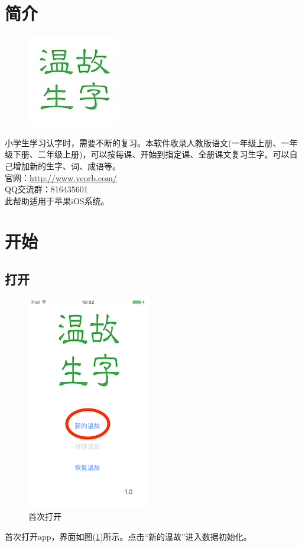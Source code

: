 \section{简介}

\begin{figure}[H]
\centering
\includegraphics{img/logo152.jpg}
\end{figure}
小学生学习认字时，需要不断的复习。本软件收录人教版语文(一年级上册、一年级下册、二年级上册)，可以按每课、开始到指定课、全册课文复习生字。可以自己增加新的生字、词、成语等。\\

官网：\url{http://www.ycorb.com/}\\

QQ交流群：816435601\\

此帮助适用于苹果iOS系统。

\section{开始}
\subsection{打开}
\begin{figure}[H]
	\centering
	\includegraphics{img/1.png}
	\caption{首次打开}
	\label{img1}
\end{figure}
首次打开app，界面如图(\ref{img1})所示。点击“新的温故”进入数据初始化。

